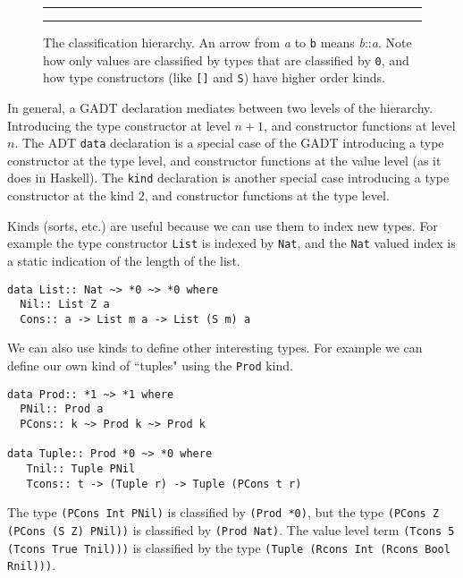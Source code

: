 \documentclass[11pt,twoside]{article}
\begin{document}
\begin{figure}
\hrule
\begin{center}
\end{center}
\vspace*{-.25in}
\caption{The classification hierarchy.
An arrow from {\it a} to {\tt b} means {\it b}::{\it a}.
Note how only values are classified by types that are classified by
{\tt *0}, and how type constructors (like {\tt []} and {\tt S})
have higher order kinds.}
\hrule
\label{Kindtree}
\end{figure}

In general, a GADT declaration mediates between two levels of the hierarchy.
Introducing the type constructor at level $n+1$, and constructor functions at
level $n$. The ADT {\tt data} declaration is a special case of the GADT
introducing a type constructor at the type level, and constructor functions at the
value level (as it does in Haskell). The {\tt kind} declaration is another
special case introducing a type constructor at the kind $2$, and constructor
functions at the type level.



Kinds (sorts, etc.) are useful because we can use them to index new types. For example
the type constructor {\tt List} is indexed by {\tt Nat}, and the {\tt Nat} valued
index is a static indication of the length of the list.
\begin{verbatim}
data List:: Nat ~> *0 ~> *0 where
  Nil:: List Z a
  Cons:: a -> List m a -> List (S m) a
\end{verbatim}
We can also use kinds to define other interesting types. For example
we can define our own kind of ``tuples" using the {\tt Prod} kind.
\begin{verbatim}
data Prod:: *1 ~> *1 where
  PNil:: Prod a
  PCons:: k ~> Prod k ~> Prod k

data Tuple:: Prod *0 ~> *0 where
   Tnil:: Tuple PNil
   Tcons:: t -> (Tuple r) -> Tuple (PCons t r)
\end{verbatim}
The type \verb+(PCons Int PNil)+ is classified
by \verb+(Prod *0)+, but the type \verb+(PCons Z (PCons (S Z) PNil))+ is classified
by \verb+(Prod Nat)+. The value level term \verb+(Tcons 5 (Tcons True Tnil)))+ is
classified by the type \verb+(Tuple (Rcons Int (Rcons Bool Rnil)))+.
\end{document}
